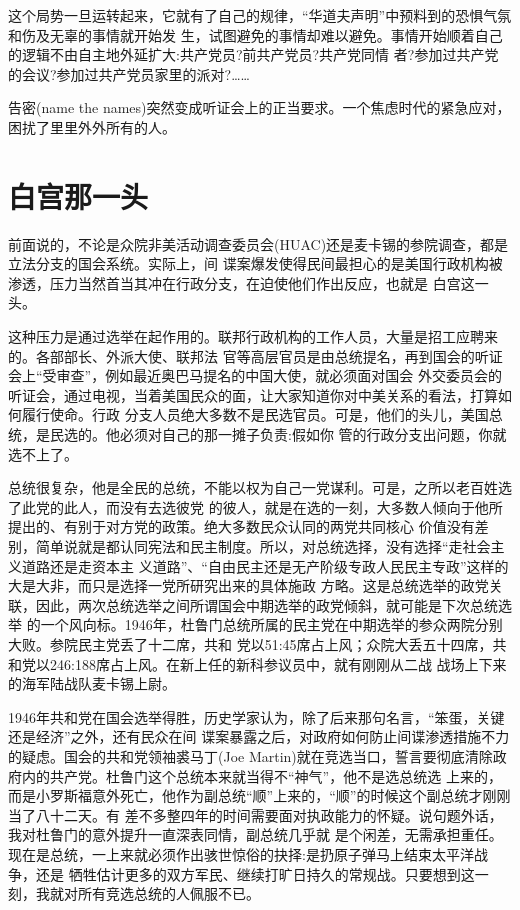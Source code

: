 \documentclass[10pt]{article}
\begin{document}
{这个局势一旦运转起来，它就有了自己的规律，``华道夫声明''中预料到的恐惧气氛和伤及无辜的事情就开始发
生，试图避免的事情却难以避免。事情开始顺着自己的逻辑不由自主地外延扩大:共产党员?前共产党员?共产党同情
者?参加过共产党的会议?参加过共产党员家里的派对?……

告密(name the names)突然变成听证会上的正当要求。一个焦虑时代的紧急应对，困扰了里里外外所有的人。

\pagebreak
\section{白宫那一头}

前面说的，不论是众院非美活动调查委员会(HUAC)还是麦卡锡的参院调查，都是立法分支的国会系统。实际上，间
谍案爆发使得民间最担心的是美国行政机构被渗透，压力当然首当其冲在行政分支，在迫使他们作出反应，也就是
白宫这一头。

这种压力是通过选举在起作用的。联邦行政机构的工作人员，大量是招工应聘来的。各部部长、外派大使、联邦法
官等高层官员是由总统提名，再到国会的听证会上``受审查''，例如最近奥巴马提名的中国大使，就必须面对国会
外交委员会的听证会，通过电视，当着美国民众的面，让大家知道你对中美关系的看法，打算如何履行使命。行政
分支人员绝大多数不是民选官员。可是，他们的头儿，美国总统，是民选的。他必须对自己的那一摊子负责:假如你
管的行政分支出问题，你就选不上了。

总统很复杂，他是全民的总统，不能以权为自己一党谋利。可是，之所以老百姓选了此党的此人，而没有去选彼党
的彼人，就是在选的一刻，大多数人倾向于他所提出的、有别于对方党的政策。绝大多数民众认同的两党共同核心
价值没有差别，简单说就是都认同宪法和民主制度。所以，对总统选择，没有选择``走社会主义道路还是走资本主
义道路''、``自由民主还是无产阶级专政人民民主专政''这样的大是大非，而只是选择一党所研究出来的具体施政
方略。这是总统选举的政党关联，因此，两次总统选举之间所谓国会中期选举的政党倾斜，就可能是下次总统选举
的一个风向标。1946年，杜鲁门总统所属的民主党在中期选举的参众两院分别大败。参院民主党丢了十二席，共和
党以51:45席占上风；众院大丢五十四席，共和党以246:188席占上风。在新上任的新科参议员中，就有刚刚从二战
战场上下来的海军陆战队麦卡锡上尉。

1946年共和党在国会选举得胜，历史学家认为，除了后来那句名言，``笨蛋，关键还是经济''之外，还有民众在间
谍案暴露之后，对政府如何防止间谍渗透措施不力的疑虑。国会的共和党领袖裘\textperiodcentered 马丁(Joe
Martin)就在竞选当口，誓言要彻底清除政府内的共产党。杜鲁门这个总统本来就当得不``神气''，他不是选总统选
上来的，而是小罗斯福意外死亡，他作为副总统``顺''上来的，``顺''的时候这个副总统才刚刚当了八十二天。有
差不多整四年的时间需要面对执政能力的怀疑。说句题外话，我对杜鲁门的意外提升一直深表同情，副总统几乎就
是个闲差，无需承担重任。现在是总统，一上来就必须作出骇世惊俗的抉择:是扔原子弹马上结束太平洋战争，还是
牺牲估计更多的双方军民、继续打旷日持久的常规战。只要想到这一刻，我就对所有竞选总统的人佩服不已。

}
\end{document}
